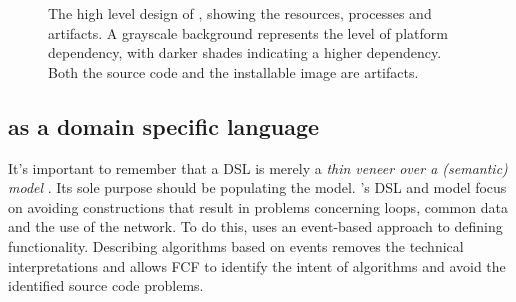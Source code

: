 \documentclass[3p,times,procedia]{elsarticle}
\begin{document}
\begin{figure}[t]
  \centering
\caption{The high level design of \FOO, showing the resources, processes and
artifacts. A grayscale background represents the level of platform dependency,
with darker shades indicating a higher dependency. Both the source code and the
installable image are artifacts.}
\label{fig:design}
\end{figure}

\subsection{\FOO as a domain specific language}
\label{dsl-design}

It's important to remember that a DSL is merely a \emph{thin veneer over a
(semantic) model} \cite{fowler2010domain}. Its sole purpose should be
populating the model. \FOO's DSL and model focus on avoiding constructions that
result in problems concerning loops, common data and the use of the network. To
do this, \FOO uses an event-based approach to defining functionality.
Describing algorithms based on events removes the technical interpretations and
allows FCF to identify the intent of algorithms and avoid the identified source
code problems.
\end{document}
